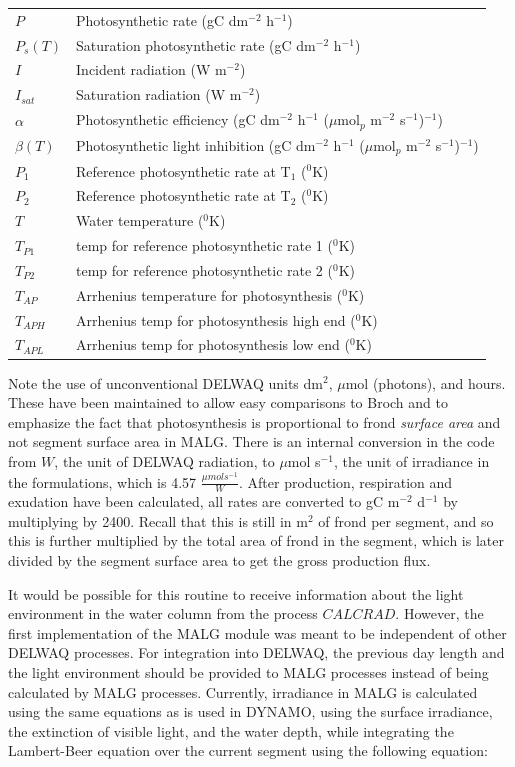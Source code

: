 \documentclass{deltares_manual}
\begin{document}
\begin{tabular}{ll}
$P$ & Photosynthetic rate (gC dm$^{-2}$ h$^{-1}$)\\
$P_s(T)$ & Saturation photosynthetic rate (gC dm$^{-2}$ h$^{-1}$)\\
$I$ & Incident radiation (W m$^{-2}$)\\
$I_{sat}$ & Saturation radiation (W m$^{-2}$)\\
$\alpha$ & Photosynthetic efficiency (gC dm$^{-2}$ h$^{-1}$ ($\mu$mol$_{p}$ m$^{-2}$ s$^{-1}$)$^{-1}$) \\
$\beta(T)$ & Photosynthetic light inhibition (gC dm$^{-2}$ h$^{-1}$ ($\mu$mol$_{p}$ m$^{-2}$ s$^{-1}$)$^{-1}$) \\
$P_1$ & Reference photosynthetic rate at T$_1$ ($^{0}$K)\\
$P_2$ & Reference photosynthetic rate at T$_2$ ($^{0}$K)\\
$T$ & Water temperature ($^{0}$K)\\
$T_{P1}$ & temp for reference photosynthetic rate 1 ($^{0}$K)\\
$T_{P2}$ & temp for reference photosynthetic rate 2	($^{0}$K)\\
$T_{AP}$ & Arrhenius temperature for photosynthesis ($^{0}$K)\\
$T_{APH}$ & Arrhenius temp for photosynthesis high end ($^{0}$K)\\
$T_{APL}$ & Arrhenius temp for photosynthesis low end ($^{0}$K)\\
\end{tabular}

Note the use of unconventional DELWAQ units dm$^{2}$, $\mu$mol (photons), and hours. These have been maintained to allow easy comparisons to Broch and to emphasize the fact that photosynthesis is proportional to frond \textit{surface area} and not segment surface area in MALG. There is an internal conversion in the code from $W$, the unit of DELWAQ radiation, to $\mu$mol s$^{-1}$, the unit of irradiance in the formulations, which is 4.57 $\frac{\mu mol s^{-1}}{W}$. After production, respiration and exudation have been calculated, all rates are converted to gC m$^{-2}$ d$^{-1}$ by multiplying by 2400. Recall that this is still in m${^2}$ of frond per segment, and so this is further multiplied by the total area of frond in the segment, which is later divided by the segment surface area to get the gross production flux.

It would be possible for this routine to receive information about the light environment in the water column from the process $CALCRAD$. However, the first implementation of the MALG module was meant to be independent of other DELWAQ processes. For integration into DELWAQ, the previous day length and the light environment should be provided to MALG processes instead of being calculated by MALG processes. Currently, irradiance in MALG is calculated using the same equations as is used in DYNAMO, using the surface irradiance, the extinction of visible light, and the water depth, while integrating the Lambert-Beer equation over the current segment using the following equation:
\end{document}

